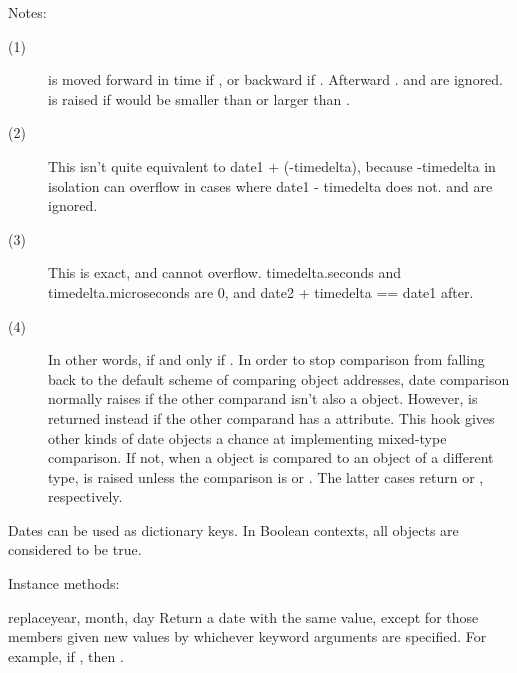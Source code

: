 Notes:
\begin{description}

\item[(1)]
  is moved forward in time if , or backward if .  Afterward
    .
     and
     are ignored.
     is raised if 
    would be smaller than  or larger than
    .

\item[(2)]
 This isn't quite equivalent to date1 +
   (-timedelta), because -timedelta in isolation can overflow in cases
   where date1 - timedelta does not.  
   and  are ignored.

\item[(3)]
This is exact, and cannot overflow.  timedelta.seconds and
    timedelta.microseconds are 0, and date2 + timedelta == date1
    after.

\item[(4)]
In other words, 
   if and only if . 
In order to stop comparison from falling back to the default
scheme of comparing object addresses, date comparison
normally raises  if the other comparand
isn't also a  object.  However, 
is returned instead if the other comparand has a
 attribute.  This hook gives other kinds of
date objects a chance at implementing mixed-type comparison.
If not, when a  object is
compared to an object of a different type,  is
raised unless the comparison is \code{==} or \code{!=}.  The latter
cases return  or , respectively.

\end{description}


Dates can be used as dictionary keys. In Boolean contexts, all
 objects are considered to be true.

Instance methods:

\begin{methoddesc}{replace}{year, month, day}
  Return a date with the same value, except for those members given
  new values by whichever keyword arguments are specified.  For
  example, if , then
  .
\end{methoddesc}

